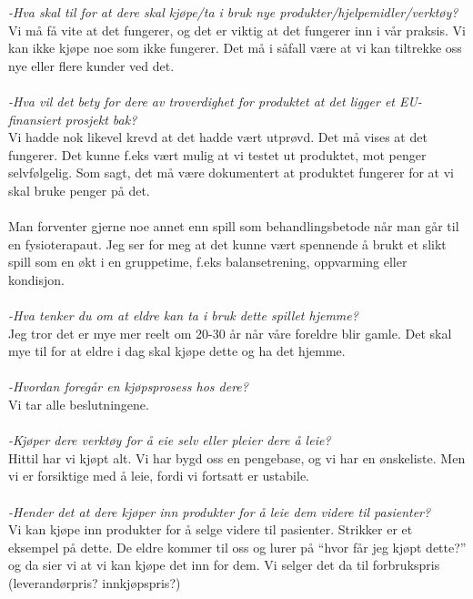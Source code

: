 \emph{-Hva skal til for at dere skal kjøpe/ta i bruk nye produkter/hjelpemidler/verktøy?}\\
Vi må få vite at det fungerer, og det er viktig at det fungerer inn i vår praksis. Vi kan ikke kjøpe noe som ikke fungerer. Det må i såfall være at vi kan tiltrekke oss nye eller flere kunder ved det.\\ \\
\emph{-Hva vil det bety for dere av troverdighet for produktet at det ligger et EU-finansiert prosjekt bak? } \\
Vi hadde nok likevel krevd at det hadde vært utprøvd. Det må vises at det fungerer. Det kunne f.eks vært mulig at vi testet ut produktet, mot penger selvfølgelig. Som sagt, det må være dokumentert at produktet fungerer for at vi skal bruke penger på det. \\ \\
Man forventer gjerne noe annet enn spill som behandlingsbetode når man går til en fysioterapaut. Jeg ser for meg at det kunne vært spennende å brukt et slikt spill som en økt i en gruppetime, f.eks balansetrening, oppvarming eller kondisjon. \\ \\
\emph{-Hva tenker du om at eldre kan ta i bruk dette spillet hjemme?}\\
Jeg tror det er mye mer reelt om 20-30 år når våre foreldre blir gamle. Det skal mye til for at eldre i dag skal kjøpe dette og ha det hjemme. \\ \\
\emph{-Hvordan foregår en kjøpsprosess hos dere?}\\
Vi tar alle beslutningene. \\ \\
\emph{-Kjøper dere verktøy for å eie selv eller pleier dere å leie?}\\
Hittil har vi kjøpt alt. Vi har bygd oss en pengebase, og vi har en ønskeliste. Men vi er forsiktige med å leie, fordi vi fortsatt er ustabile. \\ \\
\emph{-Hender det at dere kjøper inn produkter for å leie dem videre til pasienter?}\\
Vi kan kjøpe inn produkter for å selge videre til pasienter. Strikker er et eksempel på dette. De eldre kommer til oss og lurer på “hvor får jeg kjøpt dette?” og da sier vi at vi kan kjøpe det inn for dem. Vi selger det da til forbrukspris (leverandørpris? innkjøpspris?)\\ \\
